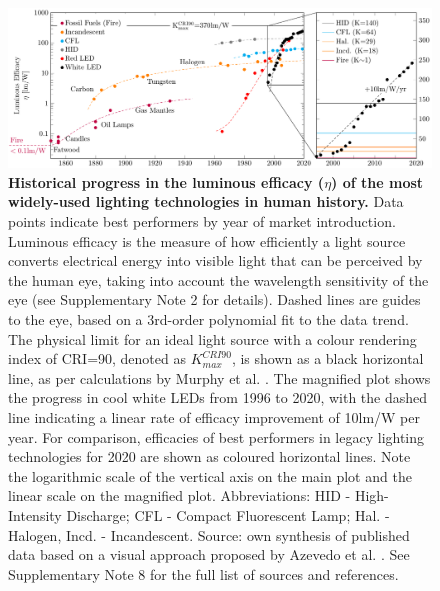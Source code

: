 \documentclass[parskip=full]{article}
\begin{document}
\begin{figure}[h!]
 \centering
 \includegraphics[width=\textwidth]{figures/history_efficacy.pdf}
 \caption{\textbf{Historical progress in the luminous efficacy ($\eta$) of the most widely-used lighting technologies in human history.} Data points indicate best performers by year of market introduction. Luminous efficacy is the measure of how efficiently a light source converts electrical energy into visible light that can be perceived by the human eye, taking into account the wavelength sensitivity of the eye (see Supplementary Note 2 for details). Dashed lines are guides to the eye, based on a 3rd-order polynomial fit to the data trend. The physical limit for an ideal light source with a colour rendering index of CRI=90, denoted as $K_{max}^{CRI90}$, is shown as a black horizontal line, as per calculations by Murphy et al. \cite{Murphy2012}. The magnified plot shows the progress in cool white LEDs from 1996 to 2020, with the dashed line indicating a linear rate of efficacy improvement of 10lm/W per year. For comparison, efficacies of best performers in legacy lighting technologies for 2020 are shown as coloured horizontal lines. Note the logarithmic scale of the vertical axis on the main plot and the linear scale on the magnified plot. Abbreviations: HID - High-Intensity Discharge; CFL - Compact Fluorescent Lamp; Hal. - Halogen, Incd. - Incandescent. Source: own synthesis of published data based on a visual approach proposed by Azevedo et al. \cite{azevedo2009transition}. See Supplementary Note 8 for the full list of sources and references.}
 \label{fgr:history_efficacy}
\end{figure}
\end{document}
